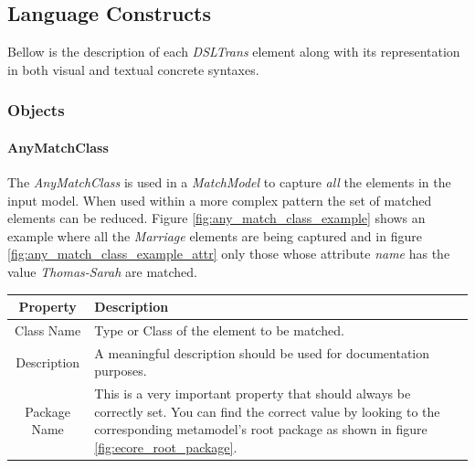 

\clearpage

\subsection{Language Constructs}

Bellow is the description of each \emph{DSLTrans} element along with its
representation in both visual and textual concrete syntaxes.




\subsubsection{Objects}

\paragraph{AnyMatchClass}

The \emph{AnyMatchClass} is used in a \emph{MatchModel} to
capture \emph{all} the elements in the input model. When used within a more
complex pattern the set of matched elements can be reduced. Figure
\ref{fig:any_match_class_example} shows an example where all the
\emph{Marriage} elements are being captured and in figure
\ref{fig:any_match_class_example_attr} only those whose attribute \emph{name}
has the value \emph{Thomas-Sarah} are matched.

\begin{center}
  \begin{tabular}{ | c | p{\paragraphsize} | }
    \hline
    \textbf{Property} & \textbf{Description} \\ \hline
    Class Name & Type or Class of the element to be matched.  \\ \hline
    Description & A meaningful description should be used for documentation
  purposes. \\ \hline
    Package Name & This is a very important property that should always be
  correctly set. You can find the
  correct value by looking to the corresponding metamodel's root package as
  shown in figure \ref{fig:ecore_root_package}. \\ \hline
  \end{tabular}
\end{center}


